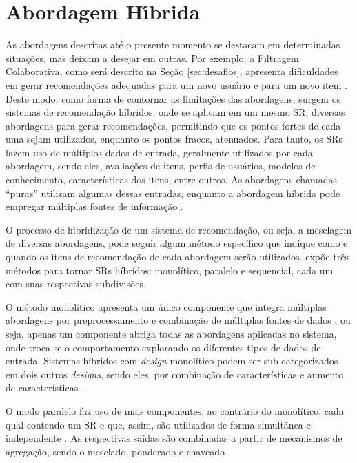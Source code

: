\section{Abordagem H\'{\i}brida}

    As abordagens descritas até o presente momento se destacam em determinadas situações, mas deixam a desejar em outras. Por exemplo, a Filtragem Colaborativa, como será descrito na Seção \ref{sec:desafios}, apresenta dificuldades em gerar recomendações adequadas para um novo usuário e para um novo item \cite{Ricci2010}. Deste modo, como forma de contornar as limitações das abordagens, surgem os sistemas de recomendação híbridos, onde se aplicam em um mesmo SR, diversas abordagens para gerar recomendações, permitindo que os pontos fortes de cada uma sejam utilizados, enquanto os pontos fracos, atenuados. Para tanto, os SRs fazem uso de múltiplos dados de entrada, geralmente utilizados por cada abordagem, sendo eles, avaliações de itens, perfis de usuários, modelos de conhecimento, características dos itens, entre outros. As abordagens chamadas ``puras'' utilizam algumas dessas entradas, enquanto a abordagem híbrida pode empregar múltiplas fontes de informação \cite{Jannach2010}.
    
    O processo de hibridização de um sistema de recomendação, ou seja, a mesclagem de diversas abordagens, pode seguir algum método específico que indique como e quando os itens de recomendação de cada abordagem serão utilizados.  expõe três métodos para tornar SRs híbridos: monolítico, paralelo e sequencial, cada um com suas respectivas subdivisões.
    
    O método monolítico apresenta um único componente que integra múltiplas abordagens por preprocessamento e combinação de múltiplas fontes de dados \cite{Aggarwal2016}, ou seja, apenas um componente abriga todas as abordagens aplicadas no sistema, onde troca-se o comportamento explorando os diferentes tipos de dados de entrada. Sistemas híbridos com \textit{design} monolítico podem ser sub-categorizados em dois outros \textit{designs}, sendo eles, por combinação de características e aumento de características \cite{Jannach2010}.
    
    O modo paralelo faz uso de mais componentes, ao contrário do monolítico, cada qual contendo um SR e que, assim, são utilizados de forma simultânea e independente \cite{Aggarwal2016}. As respectivas saídas são combinadas a partir de mecanismos de agregação, sendo o mesclado, ponderado e chaveado \cite{Jannach2010}. 
    
